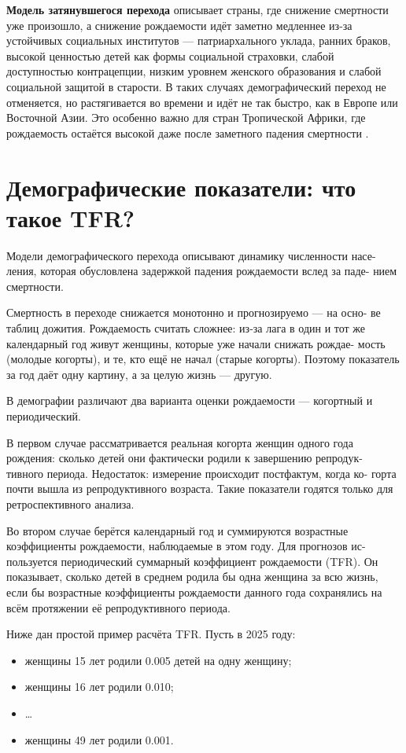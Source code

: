 \documentclass[a4paper, 14pt]{extarticle}
\begin{document}
\textbf{Модель затянувшегося перехода} описывает страны, где снижение смертности уже произошло, а снижение рождаемости идёт заметно медленнее из-за устойчивых социальных институтов — патриархального уклада, ранних браков, высокой ценностью детей как формы социальной страховки, слабой доступностью контрацепции, низким уровнем женского образования и слабой социальной защитой в старости. В таких случаях демографический переход не отменяется, но растягивается во времени и идёт не так быстро, как в Европе или Восточной Азии. Это особенно важно для стран Тропической Африки, где рождаемость остаётся высокой даже после заметного падения смертности \cite{owid_transition,owid_fertility}.

\section{Демографические показатели: что такое TFR?}

Модели демографического перехода описывают динамику численности насе-
ления, которая обусловлена задержкой падения рождаемости вслед за паде-
нием смертности.

Смертность в переходе снижается монотонно и прогнозируемо — на осно-
ве таблиц дожития. Рождаемость считать сложнее: из-за лага в один и тот
же календарный год живут женщины, которые уже начали снижать рождае-
мость (молодые когорты), и те, кто ещё не начал (старые когорты). Поэтому
показатель за год даёт одну картину, а за целую жизнь — другую.

В демографии различают два варианта оценки рождаемости — когортный
и периодический.

В первом случае рассматривается реальная когорта женщин одного года
рождения: сколько детей они фактически родили к завершению репродук-
тивного периода. Недостаток: измерение происходит постфактум, когда ко-
горта почти вышла из репродуктивного возраста. Такие показатели годятся
только для ретроспективного анализа.

Во втором случае берётся календарный год и суммируются возрастные
коэффициенты рождаемости, наблюдаемые в этом году. Для прогнозов ис-
пользуется периодический суммарный коэффициент рождаемости (TFR). Он
показывает, сколько детей в среднем родила бы одна женщина за всю жизнь,
если бы возрастные коэффициенты рождаемости данного года сохранялись
на всём протяжении её репродуктивного периода.

Ниже дан простой пример расчёта TFR. Пусть в 2025 году:

\begin{itemize}
    \item женщины 15 лет родили 0.005 детей на одну женщину;
    \item женщины 16 лет родили 0.010;
    \item \dots
    \item женщины 49 лет родили 0.001.
\end{itemize}
\end{document}
